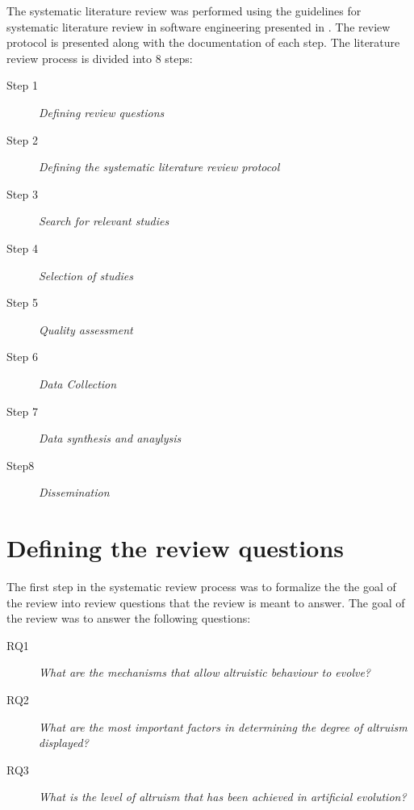 \documentclass[a4paper]{book}
\begin{document}


The systematic literature review was performed using the guidelines for systematic 
literature review in software engineering presented in \cite{keele_guidelines_2007}.
The review protocol is presented along with the documentation of each step.
The literature review process is divided into 8 steps: %

\begin{description}
\item[Step 1] {\it Defining review questions}

\item[Step 2] {\it Defining the systematic literature review protocol}

\item[Step 3] {\it Search for relevant studies}

\item[Step 4] {\it Selection of studies}

\item[Step 5] {\it Quality assessment}

\item[Step 6] {\it Data Collection}

\item[Step 7] {\it Data synthesis and anaylysis}

\item[Step8] {\it Dissemination}

\end{description}

\clearpage 

\section{Defining the review questions}
The first step in the systematic review process was to formalize the the goal of the review into review questions that the review is meant to answer. The goal of the review was to answer the following questions:

\begin{description}
\item[RQ1] {\it What are the mechanisms that allow altruistic behaviour to evolve?} 
\item[RQ2] {\it What are the most important factors in determining the degree of altruism displayed?}
\item[RQ3] {\it What is the level of altruism that has been achieved in artificial evolution?}

\end{description}
\end{document}
